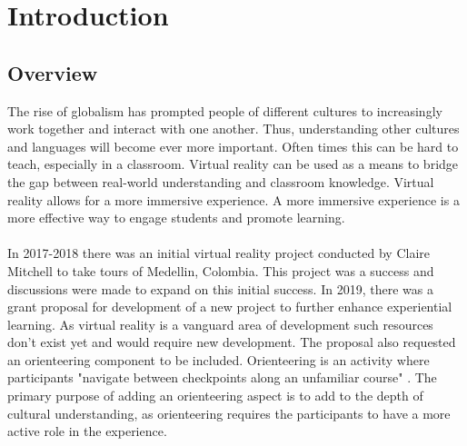 \section{Introduction}
\label{sec:Introduction}

\subsection{Overview} 
The rise of globalism has prompted people of different cultures to increasingly work together and interact with one another. Thus, understanding other cultures and languages will become ever more important. Often times this can be hard to teach, especially in a classroom. Virtual reality can be used as a means to bridge the gap between real-world understanding and classroom knowledge. Virtual reality allows for a more immersive experience. A more immersive experience is a more effective way to engage students and promote learning. \\
\\
In 2017-2018 there was an initial virtual reality project conducted by Claire Mitchell to take tours of Medellin, Colombia. This project was a success and discussions were made to expand on this initial success. In 2019, there was a grant proposal for development of a new project to further enhance experiential learning. As virtual reality is a vanguard area of development such resources don't exist yet and would require new development. The proposal also requested an orienteering component to be included. Orienteering is an activity where participants "navigate between checkpoints along an unfamiliar course" \cite{orienteering}. The primary purpose of adding an orienteering aspect is to add to the depth of cultural understanding, as orienteering requires the participants to have a more active role in the experience. 
